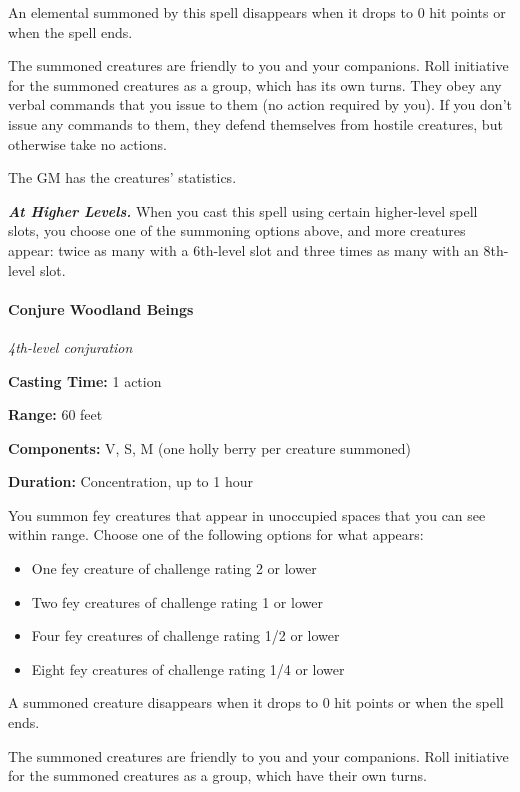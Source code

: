 \documentclass[
]{article}
\providecommand{\tightlist}{%
  \setlength{\itemsep}{0pt}\setlength{\parskip}{0pt}}
\begin{document}
An elemental summoned by this spell disappears when it drops to 0 hit
points or when the spell ends.

The summoned creatures are friendly to you and your companions. Roll
initiative for the summoned creatures as a group, which has its own
turns. They obey any verbal commands that you issue to them (no action
required by you). If you don't issue any commands to them, they defend
themselves from hostile creatures, but otherwise take no actions.

The GM has the creatures' statistics.

\emph{\textbf{At Higher Levels.}} When you cast this spell using certain
higher-level spell slots, you choose one of the summoning options above,
and more creatures appear: twice as many with a 6th-level slot and three
times as many with an 8th-level slot.

\hypertarget{conjure-woodland-beings}{%
\paragraph{Conjure Woodland Beings}\label{conjure-woodland-beings}}

\emph{4th-level conjuration}

\textbf{Casting Time:} 1 action

\textbf{Range:} 60 feet

\textbf{Components:} V, S, M (one holly berry per creature summoned)

\textbf{Duration:} Concentration, up to 1 hour

You summon fey creatures that appear in unoccupied spaces that you can
see within range. Choose one of the following options for what appears:

\begin{itemize}
\tightlist
\item
  One fey creature of challenge rating 2 or lower
\item
  Two fey creatures of challenge rating 1 or lower
\item
  Four fey creatures of challenge rating 1/2 or lower
\item
  Eight fey creatures of challenge rating 1/4 or lower
\end{itemize}

A summoned creature disappears when it drops to 0 hit points or when the
spell ends.

The summoned creatures are friendly to you and your companions. Roll
initiative for the summoned creatures as a group, which have their own
turns.
\end{document}
